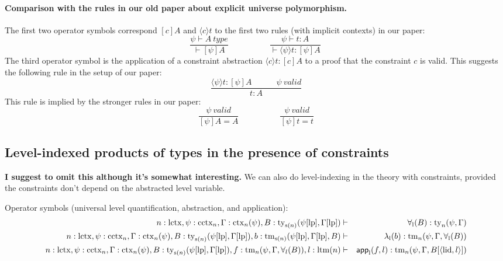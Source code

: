 \documentclass[11pt,a4paper]{article}
\theoremstyle{definition}
\newcommand{\app}[2]{{#1\,#2}} %
\def\lctx{\mathrm{lctx}}
\def\ltm{\mathrm{ltm}}
\def\lp{\mathrm{lp}}
\def\s{\mathrm{s}}
\def\lid{\mathrm{lid}}
\def\cctx{\mathrm{cctx}}
\newcommand{\ctx}{\mathrm{ctx}}
\newcommand{\ty}{\mathrm{ty}}
\newcommand{\tm}{\mathrm{tm}}
\newcommand{\tuple}[1]{\langle #1 \rangle}
\def\app{\mathsf{app}}
\begin{document}
\paragraph{Comparison with the rules in our old paper about explicit universe polymorphism.}
The first two operator symbols correspond $[c]A$ and $\langle c \rangle t$ to the first two rules (with implicit contexts) in our paper:
$$
\frac{\psi \vdash A\ type}{\vdash [\psi]A}
\hspace{5em}
\frac{\psi \vdash t : A}{\vdash \langle \psi \rangle t : [\psi]A}\
$$
The third operator symbol is the application of a constraint abstraction $\langle c \rangle t : [c]A$ to a proof that the constraint $c$ is valid. This suggests the following rule in the setup of our paper:
$$
\frac{\langle \psi \rangle t : [\psi]A\hspace{3em}\psi\ valid}
{t : A}
$$
This rule is implied by the stronger rules in our paper:
$$
\frac
{\psi\ valid}
{[\psi]A = A}
\hspace{5em}
\frac
{\psi\ valid}
{[\psi]t  = t}
$$

\subsection{Level-indexed products of types in the presence of constraints}

{\bf I suggest to omit this although it's somewhat interesting.}
We can also do level-indexing in the theory with constraints, provided the constraints don't depend on the abstracted level variable.

\begin{tiny}
Operator symbols (universal level quantification, abstraction, and application):
\begin{eqnarray*}
n : \lctx, \psi : \cctx_{n}, \Gamma : \ctx_n(\psi), B : \ty_{\s(n)}(\psi[\lp],\Gamma[\lp])&\vdash& \forall_\l(B) : \ty_n(\psi,\Gamma)\\
n : \lctx, \psi : \cctx_{n}, \Gamma : \ctx_n(\psi), B : \ty_{\s(n)}(\psi[\lp],\Gamma[\lp]), b : \tm_{\s(n)}(\psi[\lp],\Gamma[\lp], B) &\vdash&  \lambda_\l(b) : \tm_n(\psi,\Gamma,\forall_\l(B))\\
n : \lctx, \psi : \cctx_{n}, \Gamma : \ctx_n(\psi), B : \ty_{\s(n)}(\psi[\lp],\Gamma[\lp]), f :  \tm_n(\psi,\Gamma,\forall_l(B)),  l : \ltm(n) &\vdash& \app_\l(f,l) : \tm_n(\psi,\Gamma, B[\tuple{\lid,l}])
\end{eqnarray*}
\end{tiny}
\end{document}
